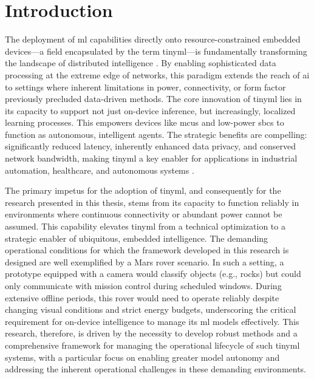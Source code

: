 
\chapter{Introduction}
\label{chp:Introduction}

The deployment of \gls{ml} capabilities directly onto resource-constrained embedded devices—a field encapsulated by the term \gls{tinyml}—is fundamentally transforming the landscape of distributed intelligence \cite{duttaTinyMLMeetsIoT2021, immonenTinyMachineLearning2022, zaidiUnlockingEdgeIntelligence2022}. By enabling sophisticated data processing at the extreme edge of networks, this paradigm extends the reach of \gls{ai} to settings where inherent limitations in power, connectivity, or form factor previously precluded data-driven methods. The core innovation of \gls{tinyml} lies in its capacity to support not just on-device inference, but increasingly, localized learning processes. This empowers devices like \glspl{mcu} and low-power \glspl{sbc} to function as autonomous, intelligent agents. The strategic benefits are compelling: significantly reduced latency, inherently enhanced data privacy, and conserved network bandwidth, making \gls{tinyml} a key enabler for applications in industrial automation, healthcare, and autonomous systems \cite{tsoukasReviewEmergingTechnology2024, gillEdgeAITaxonomy2024}.

The primary impetus for the adoption of \gls{tinyml}, and consequently for the research presented in this thesis, stems from its capacity to function reliably in environments where continuous connectivity or abundant power cannot be assumed. This capability elevates \gls{tinyml} from a technical optimization to a strategic enabler of ubiquitous, embedded intelligence. The demanding operational conditions for which the framework developed in this research is designed are well exemplified by a Mars rover scenario. In such a setting, a prototype equipped with a camera would classify objects (e.g., rocks) but could only communicate with mission control during scheduled windows. During extensive offline periods, this rover would need to operate reliably despite changing visual conditions and strict energy budgets, underscoring the critical requirement for on-device intelligence to manage its \gls{ml} models effectively. This research, therefore, is driven by the necessity to develop robust methods and a comprehensive framework for managing the operational lifecycle of such \gls{tinyml} systems, with a particular focus on enabling greater model autonomy and addressing the inherent operational challenges in these demanding environments. 

